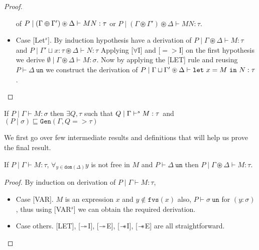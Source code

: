 \begin{proof}
\begin{itemize}
    of $P \mid (\Gamma \varoplus \Gamma') \circledast \Delta \vdash M N:\tau$ or $P \mid (\Gamma \circledast \Gamma') \circledast \Delta \vdash M N:\tau$.
  \item{Case [Let$^s$].}
    By induction hypothesis have a derivation of $P \mid \Gamma \circledast \Delta \vdash M: \tau$ and $P \mid \Gamma' \sqcup x:\tau \circledast \Delta \vdash N:\tau$
    Applying [$\forall$I] and [$=>$I] on the first hypothesis we derive $\emptyset \mid \Gamma \circledast \Delta \vdash M: \sigma$. Now by applying
    the [LET] rule and reusing $P \vdash \Delta\ \texttt{un}$ we construct the derivation of
    $P \mid \Gamma \sqcup \Gamma' \circledast \Delta \vdash \texttt{let}\ x = M\ \texttt{in}\ N:\tau$.\qedhere
  \end{itemize}
\end{proof}


\begin{theorem}\label{thm:completeness-syntax-directed}
  If $P \mid \Gamma \vdash M:\sigma$ then
  $\exists Q, \tau$ such that $Q \mid \Gamma \vdash^s M:\tau$
  and $(P \mid \sigma) \sqsubseteq \texttt{Gen}(\Gamma, Q => \tau)$
\end{theorem}

We first go over few intermediate results and definitions that will help us prove the final result.

\begin{lemma}\label{lemma:WKN-UN-helper}
  If $P \mid \Gamma \vdash M:\tau$, $\forall_{y \in \texttt{dom}(\Delta)} y$ is not free in $M$ and $P \vdash \Delta\ \texttt{un}$
  then $P \mid \Gamma \circledast \Delta \vdash M:\tau$.
\end{lemma}
\begin{proof}
  By induction on derivation of $P \mid \Gamma \vdash M:\tau$,
  \begin{itemize}
  \item{Case [VAR].} $M$ is an expression $x$ and $y \notin \texttt{fvs}(x)$ also, $P \vdash \sigma\ \texttt{un}$ for $(y:\sigma)$, thus
    using [VAR$^s$] we can obtain the required derivation.
  \item{Case others.} [LET], [$\twoheadrightarrow$I], [$\twoheadrightarrow$E], [$\mathrel{-\mkern-6mu*}$I], [$\mathrel{-\mkern-6mu*}$E] are all straightforward.\qedhere
  \end{itemize}
\end{proof}

